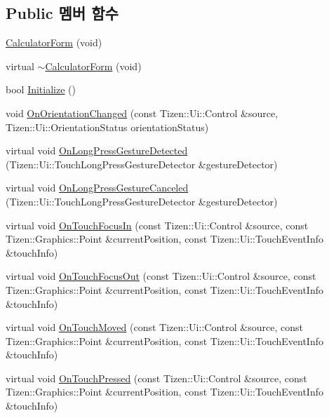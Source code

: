 \subsection*{Public 멤버 함수}
\begin{DoxyCompactItemize}
\item 
\hyperlink{class_calculator_form_a9ca53c4d95d365be85a7d1c722eb4eaf}{Calculator\+Form} (void)
\item 
virtual \hyperlink{class_calculator_form_a4287a4a56574e3d7153629e9032b7519}{$\sim$\+Calculator\+Form} (void)
\item 
bool \hyperlink{class_calculator_form_a51137823626f92e48605c6d9aa2e220f}{Initialize} ()
\item 
void \hyperlink{class_calculator_form_ac298449ce5bedae6a69ccd2f13594ce2}{On\+Orientation\+Changed} (const Tizen\+::\+Ui\+::\+Control \&source, Tizen\+::\+Ui\+::\+Orientation\+Status orientation\+Status)
\item 
virtual void \hyperlink{class_calculator_form_a636fe70d8357bc09e2404227a8fbc6d7}{On\+Long\+Press\+Gesture\+Detected} (Tizen\+::\+Ui\+::\+Touch\+Long\+Press\+Gesture\+Detector \&gesture\+Detector)
\item 
virtual void \hyperlink{class_calculator_form_acd85d807e5b1033d588828dc4685c021}{On\+Long\+Press\+Gesture\+Canceled} (Tizen\+::\+Ui\+::\+Touch\+Long\+Press\+Gesture\+Detector \&gesture\+Detector)
\item 
virtual void \hyperlink{class_calculator_form_a7605c35fa6faaadbce71705c19403907}{On\+Touch\+Focus\+In} (const Tizen\+::\+Ui\+::\+Control \&source, const Tizen\+::\+Graphics\+::\+Point \&current\+Position, const Tizen\+::\+Ui\+::\+Touch\+Event\+Info \&touch\+Info)
\item 
virtual void \hyperlink{class_calculator_form_a3d05f489ea3b0417143c6824642299b8}{On\+Touch\+Focus\+Out} (const Tizen\+::\+Ui\+::\+Control \&source, const Tizen\+::\+Graphics\+::\+Point \&current\+Position, const Tizen\+::\+Ui\+::\+Touch\+Event\+Info \&touch\+Info)
\item 
virtual void \hyperlink{class_calculator_form_ac710421b5902c784ffc1dd853d0b9036}{On\+Touch\+Moved} (const Tizen\+::\+Ui\+::\+Control \&source, const Tizen\+::\+Graphics\+::\+Point \&current\+Position, const Tizen\+::\+Ui\+::\+Touch\+Event\+Info \&touch\+Info)
\item 
virtual void \hyperlink{class_calculator_form_ae0cae03d37d3913bbe0971ad997af4e5}{On\+Touch\+Pressed} (const Tizen\+::\+Ui\+::\+Control \&source, const Tizen\+::\+Graphics\+::\+Point \&current\+Position, const Tizen\+::\+Ui\+::\+Touch\+Event\+Info \&touch\+Info)

\end{DoxyCompactItemize}
